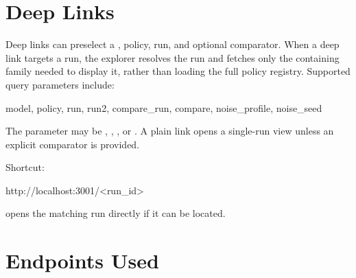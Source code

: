 \documentclass[11pt]{article}
\begin{document}
\section*{Deep Links}
Deep links can preselect a \termSimulator, policy, run, and optional comparator.
When a deep link targets a run, the explorer resolves the run and fetches only the containing family needed to display it, rather than loading the full policy registry.
Supported query parameters include:

\begin{DocCode}
model, policy, run, run2, compare_run, compare, noise_profile, noise_seed
\end{DocCode}

The  parameter may be , , , or .
A plain  link opens a single-run view unless an explicit comparator is provided.

Shortcut:

\begin{DocCode}
http://localhost:3001/<run_id>
\end{DocCode}

opens the matching run directly if it can be located.

\section*{Endpoints Used}
\end{document}

